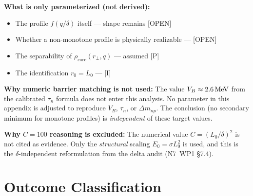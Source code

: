 \textbf{What is only parameterized (not derived):}
\begin{itemize}
    \item The profile $f(q/\delta)$ itself --- shape remains [OPEN]
    \item Whether a non-monotone profile is physically realizable
          --- [OPEN]
    \item The separability of $\rho_{\mathrm{core}}(r_\perp, q)$
          --- assumed [P]
    \item The identification $r_0 = L_0$ --- [I]
\end{itemize}

\textbf{Why numeric barrier matching is not used:}
The value $V_B \approx 2.6\,\mathrm{MeV}$ from the calibrated $\tau_n$ formula
does not enter this analysis. No parameter in this appendix is adjusted
to reproduce $V_B$, $\tau_n$, or $\Delta m_{np}$. The conclusion (no
secondary minimum for monotone profiles) is \emph{independent} of these
target values.

\textbf{Why $C = 100$ reasoning is excluded:}
The numerical value $C = (L_0/\delta)^2$ is not cited as evidence.
Only the \emph{structural} scaling $E_0 = \sigma L_0^2$ is used,
and this is the $\delta$-independent reformulation from the delta
audit (N7~WP1 \S7.4).

\section{Outcome Classification}
\label{sec:P2N7:outcome}

